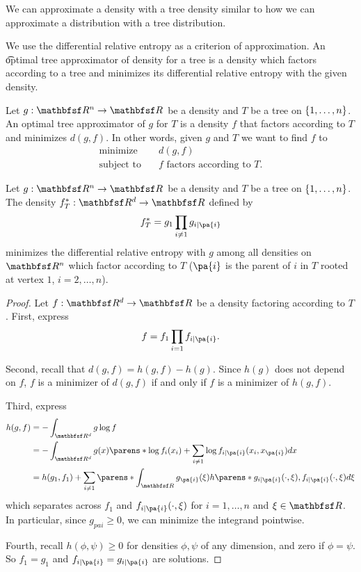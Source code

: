 
We can approximate a density with a tree density similar to how we can approximate a distribution with a tree distribution.


We use the differential relative entropy as a criterion of approximation.
An \t{optimal tree approximator} of density for a tree is a density which factors according to a tree and minimizes its differential relative entropy with the given density.


Let $g: \R^n \to \R$ be a density and $T$ be a tree on $\{1, \dots, n\}$.
An optimal tree approximator of $g$ for $T$ is a density $f$ that factors according to $T$ and minimizes $d(g, f)$.
In other words, given $g$ and $T$ we want to find $f$ to
\[
  \begin{aligned}
    \text{minimize}   &\quad d(g, f) \\
    \text{subject to} &\quad f \text{ factors according to } T.
  \end{aligned}
\]


\begin{prop}

Let $g: \R^n \to \R$ be a density and $T$ be a tree on $\{1, \dots, n\}$.
The density $f^*_T: \R^d \to \R$ defined by
$$
  f^*_T = g_1 \prod_{i \neq 1} g_{i \mid \pa{i}}
$$
minimizes the differential relative entropy with $g$ among all densities on $\R^n$ which factor according to $T$ ($\pa{i}$ is the parent of $i$ in $T$ rooted at vertex $1$, $i = 2, \dots, n$).

\begin{proof}

Let $f: \R^d \to \R$ be a density factoring according to $T$.
First, express
$$
  f = f_1 \prod_{i = 1} f_{i \mid \pa{i}}.
$$

Second, recall that $d(g, f) = h(g, f) - h(g)$.
Since $h(g)$ does not depend on $f$, $f$ is a minimizer of $d(g, f)$ if and only if $f$ is a minimizer of $h(g, f)$.

Third, express
$$
\begin{aligned}
  h(g, f) &= - \int_{\R^d} g \log f \\
          &= - \int_{\R^d} g(x) \parens*{ \log f_{i}(x_i) + \sum_{i \neq 1} \log f_{i \mid \pa{i}}(x_i, x_{\pa{i}})} dx \\
          &= h(g_1, f_1) + \sum_{i \neq 1} \parens*{ \int_{\R} g_{\pa{i}}(\xi) h\parens*{g_{i \mid \pa{i}}(\cdot, \xi), f_{i\mid\pa{i}}(\cdot,\xi)}d\xi}
\end{aligned}
$$
which separates across $f_1$ and $f_{i \mid \pa{i}}(\cdot, \xi)$ for $i = 1, \dots, n$ and $\xi \in \R$.
In particular, since $g_{pa{i}} \geq 0$,
we can minimize the integrand pointwise.

Fourth, recall $h(\phi, \psi) \geq 0$ for densities $\phi, \psi$ of any dimension, and zero if $\phi = \psi$.
So $f_1 = g_1$ and $f_{i \mid \pa{i}} = g_{i \mid \pa{i}}$ are solutions.

\end{proof}

\end{prop}

\strats
